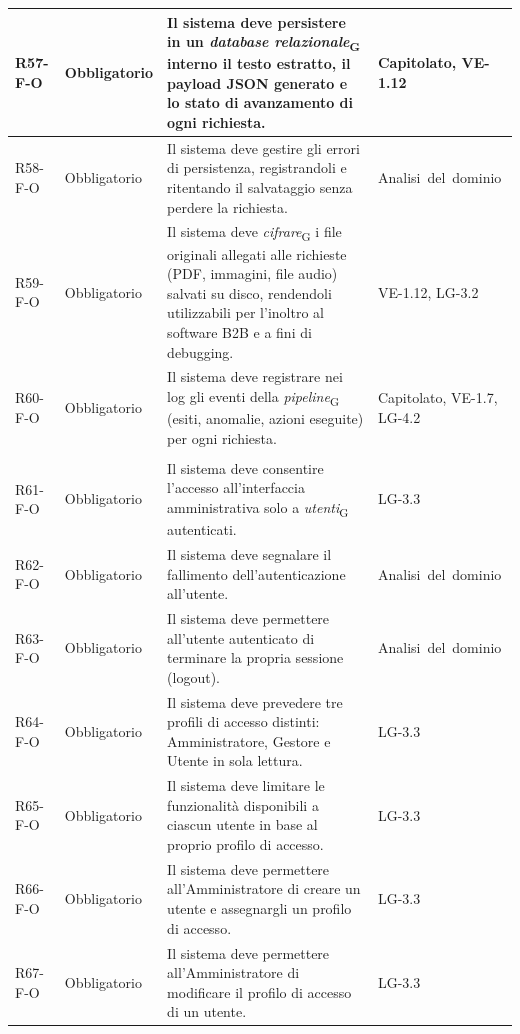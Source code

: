 {\begin{longtable}{|>{\raggedright\arraybackslash}p{1.8cm}|>{\raggedright\arraybackslash}p{2.3cm}|>{\raggedright\arraybackslash}p{6.6cm}|>{\raggedright\arraybackslash}p{3.1cm}|}
    \mbox{R57-F-O} & Obbligatorio & Il sistema deve persistere in un \textit{database relazionale}\textsubscript{G} interno il testo estratto, il payload JSON generato e lo stato di avanzamento di ogni richiesta. & \mbox{Capitolato}, \mbox{VE-1.12} \\ \hline
    \mbox{R58-F-O} & Obbligatorio & Il sistema deve gestire gli errori di persistenza, registrandoli e ritentando il salvataggio senza perdere la richiesta. & \mbox{Analisi del dominio} \\ \hline
    \mbox{R59-F-O} & Obbligatorio & Il sistema deve \textit{cifrare}\textsubscript{G} i file originali allegati alle richieste (PDF, immagini, file audio) salvati su disco, rendendoli utilizzabili per l'inoltro al software B2B e a fini di debugging. & \mbox{VE-1.12}, \mbox{LG-3.2} \\ \hline
    \mbox{R60-F-O} & Obbligatorio & Il sistema deve registrare nei log gli eventi della \textit{pipeline}\textsubscript{G} (esiti, anomalie, azioni eseguite) per ogni richiesta. & \mbox{Capitolato}, \mbox{VE-1.7}, \mbox{LG-4.2} \\ \hline
    \multicolumn{4}{|l|}{\cellcolor[gray]{0.94}\textbf{Macroarea 6 --- Interfaccia amministrativa e profili di accesso}} \\ \hline
    \mbox{R61-F-O} & Obbligatorio & Il sistema deve consentire l'accesso all'interfaccia amministrativa solo a \textit{utenti}\textsubscript{G} autenticati. & \mbox{LG-3.3} \\ \hline
    \mbox{R62-F-O} & Obbligatorio & Il sistema deve segnalare il fallimento dell'autenticazione all'utente. & \mbox{Analisi del dominio} \\ \hline
    \mbox{R63-F-O} & Obbligatorio & Il sistema deve permettere all'utente autenticato di terminare la propria sessione (logout). & \mbox{Analisi del dominio} \\ \hline
    \mbox{R64-F-O} & Obbligatorio & Il sistema deve prevedere tre profili di accesso distinti: Amministratore, Gestore e Utente in sola lettura. & \mbox{LG-3.3} \\ \hline
    \mbox{R65-F-O} & Obbligatorio & Il sistema deve limitare le funzionalità disponibili a ciascun utente in base al proprio profilo di accesso. & \mbox{LG-3.3} \\ \hline
    \mbox{R66-F-O} & Obbligatorio & Il sistema deve permettere all'Amministratore di creare un utente e assegnargli un profilo di accesso. & \mbox{LG-3.3} \\ \hline
    \mbox{R67-F-O} & Obbligatorio & Il sistema deve permettere all'Amministratore di modificare il profilo di accesso di un utente. & \mbox{LG-3.3} \\ \hline

\end{longtable}}
